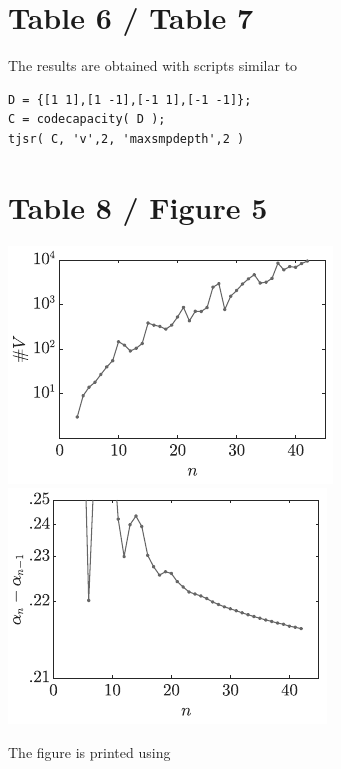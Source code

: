 \section{Table 6 / Table 7}
The results are obtained with scripts similar to
{\small%
\begin{lstlisting}
D = {[1 1],[1 -1],[-1 1],[-1 -1]};
C = codecapacity( D );
tjsr( C, 'v',2, 'maxsmpdepth',2 )
\end{lstlisting}%
}

\section{Table 8 / Figure 5}
\begin{center}
    \includegraphics{./graphics/nVdaub}$\qquad$
    \includegraphics{./graphics/aldaub}
\end{center}
The figure is printed using
